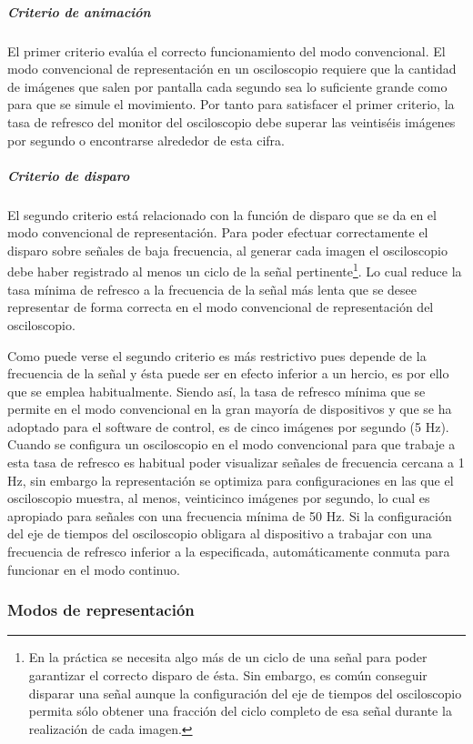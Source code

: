 \subparagraph{Criterio de animación}

El primer criterio evalúa el correcto funcionamiento del modo convencional.
El modo convencional de representación en un osciloscopio requiere que la
cantidad de imágenes que salen por pantalla cada segundo sea lo suficiente
grande como para que se simule el movimiento. Por tanto para satisfacer el
primer criterio, la tasa de refresco del monitor del osciloscopio debe
superar las veintiséis imágenes por segundo o encontrarse alrededor de esta
cifra.


\subparagraph{Criterio de disparo}

El segundo criterio está relacionado con la función de disparo que se da en
el modo convencional de representación. Para poder efectuar correctamente
el disparo sobre señales de baja frecuencia, al generar cada imagen el
osciloscopio debe haber registrado al menos un ciclo de la señal
pertinente\footnote{En la práctica se necesita algo más de un ciclo de una
señal para poder garantizar el correcto disparo de ésta. Sin embargo, es
común conseguir disparar una señal aunque la configuración del eje de
tiempos del osciloscopio permita sólo obtener una fracción del ciclo
completo de esa señal durante la realización de cada imagen.}. Lo cual
reduce la tasa mínima de refresco a la frecuencia de la señal más lenta que
se desee representar de forma correcta en el modo convencional de
representación del osciloscopio.

Como puede verse el segundo criterio es más restrictivo pues depende de la
frecuencia de la señal y ésta puede ser en efecto inferior a un hercio, es
por ello que se emplea habitualmente. Siendo así, la tasa de refresco
mínima que se permite en el modo convencional en la gran mayoría de
dispositivos y que se ha adoptado para el software de control, es de cinco
imágenes por segundo (5 Hz). Cuando se configura un osciloscopio en el modo
convencional para que trabaje a esta tasa de refresco es habitual poder
visualizar señales de frecuencia cercana a 1 Hz, sin embargo la
representación se optimiza para configuraciones en las que el osciloscopio
muestra, al menos, veinticinco imágenes por segundo, lo cual es apropiado
para señales con una frecuencia mínima de 50 Hz. Si la configuración del
eje de tiempos del osciloscopio obligara al dispositivo a trabajar con una
frecuencia de refresco inferior a la especificada, automáticamente conmuta
para funcionar en el modo continuo.


\subsubsection{Modos de representación}

